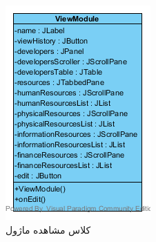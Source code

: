 \begin{figure}[H]
	\centering
	\begin{subfigure}[b]{0.3\textwidth}
	\includegraphics[width=\textwidth]{img/class-design/ui/ViewModule.png}
	\caption{کلاس مشاهده ماژول}
	\end{subfigure}
	\hfill
	\begin{subfigure}[b]{0.3\textwidth}

\end{subfigure}
\end{figure}
